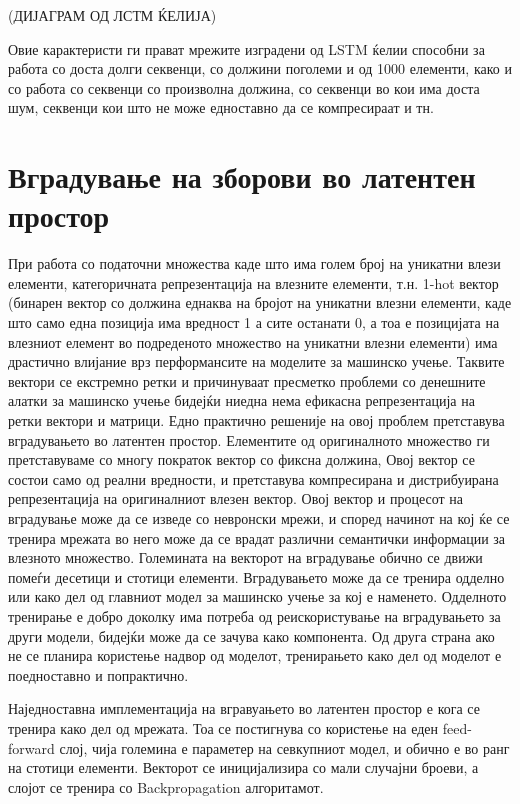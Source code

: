 (ДИЈАГРАМ ОД ЛСТМ ЌЕЛИЈА)

Овие карактеристи ги прават мрежите изградени од LSTM ќелии способни за работа со доста долги секвенци, со должини поголеми и од 1000 елементи, како и со работа со секвенци со произволна должина, со секвенци во кои има доста шум, секвенци кои што не може едноставно да се компресираат и тн.

\section{Вградување на зборови во латентен простор}

При работа со податочни множества каде што има голем број на уникатни влези елементи, категоричната репрезентација на влезните елементи, т.н. 1-hot вектор (бинарен вектор со должина еднаква на бројот на уникатни влезни елементи, каде што само една позиција има вредност 1 а сите останати 0, а тоа е позицијата на влезниот елемент во подреденото множество на уникатни влезни елементи) има драстично влијание врз перформансите на моделите за машинско учење. Таквите вектори се екстремно ретки и причинуваат пресметко проблеми со денешните алатки за машинско учење бидејќи ниедна нема ефикасна репрезентација на ретки вектори и матрици. 
Едно практично решеније на овој проблем претставува вградувањето во латентен простор. Елементите од оригиналното множество ги претставуваме со многу пократок вектор со фиксна должина, Овој вектор се состои само од реални вредности, и претставува компресирана и дистрибуирана репрезентација на оригиналниот влезен вектор. Овој вектор и процесот на вградување може да се изведе со невронски мрежи, и според начинот на кој ќе се тренира мрежата во него може да се врадат различни семантички информации за влезното множество. Големината на векторот на вградување обично се движи помеѓи десетици и стотици елементи.
Вградувањето може да се тренира одделно или како дел од главниот модел за машинско учење за кој е наменето. Одделното тренирање е добро доколку има потреба од реискористување на вградувањето за други модели, бидејќи може да се зачува како компонента. Од друга страна ако не се планира користење надвор од моделот, тренирањето како дел од моделот е поедноставно и попрактично.

Наједноставна имплементација на вгравуањето во латентен простор е кога се тренира како дел од мрежата. Тоа се постигнува со користење на еден feed-forward слој, чија големина е параметер на севкупниот модел, и обично е во ранг на стотици елементи. Векторот се иницијализира со мали случајни броеви, а слојот се тренира со Backpropagation алгоритамот.

